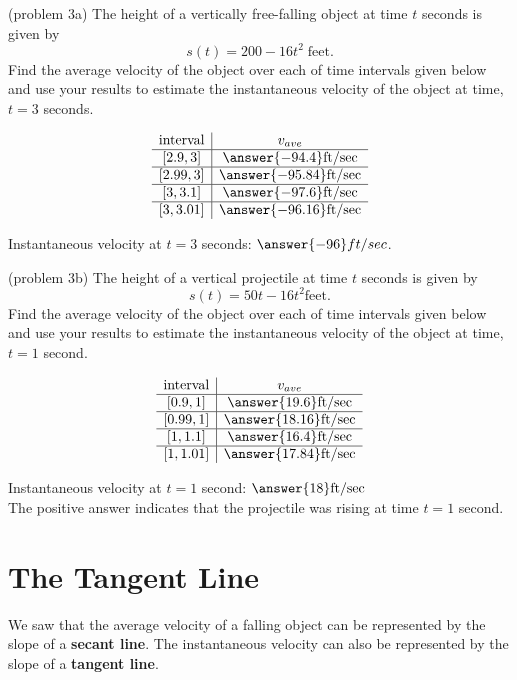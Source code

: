 \documentclass[handout]{ximera}
\begin{document}
\begin{problem}(problem 3a)
The height of a vertically free-falling object at time $t$ seconds is given by
\[
s(t) = 200 - 16t^2 \; \text{feet}.
\]
Find the average velocity of the object over each of time intervals given below and use your 
results to estimate the instantaneous velocity
of the object at time, $t = 3$ seconds.

\[
\begin{array}{ c | c  }
   \text{interval}& v_{ave} \\ 
	\hline
	[2.9, 3] & \answer{-94.4} \text{ft/sec} \\
	\hline
	[2.99, 3] & \answer{-95.84} \text{ft/sec} \\
	\hline
	[3, 3.1] & \answer{-97.6} \text{ft/sec} \\
	\hline
	[3, 3.01] & \answer{-96.16} \text{ft/sec}
\end{array}
\]


Instantaneous velocity at $t = 3$ seconds: $\answer{-96}ft/sec$.

\end{problem}


\begin{problem}(problem 3b)
The height of a vertical projectile at time $t$ seconds is given by
\[
s(t) = 50t - 16t^2 \text{feet}.
\]
Find the average velocity of the object over each of time intervals given below and use your 
results to estimate the instantaneous velocity
of the object at time, $t = 1$ second.

\[
\begin{array}{ c | c  }
   \text{interval}& v_{ave} \\ 
	\hline
	[0.9, 1] & \answer{19.6} \text{ft/sec} \\
	\hline
	[0.99, 1] & \answer{18.16} \text{ft/sec} \\
	\hline
	[1, 1.1] & \answer{16.4} \text{ft/sec} \\
	\hline
	[1, 1.01] & \answer{17.84} \text{ft/sec}
\end{array}
\]


Instantaneous velocity at $t = 1$ second: $\answer{18}\text{ft/sec}$\\
The positive answer indicates that the projectile was rising at time $t= 1$ second.

\end{problem}

\section{The Tangent Line}
We saw that the average velocity of a falling object can be represented by the slope of a \textbf{secant line}. 
The instantaneous velocity can also be represented by the slope of a \textbf{tangent line}.
\end{document}
